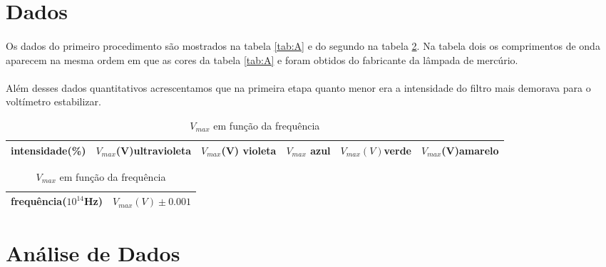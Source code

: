 \documentclass[a4paper,11pt]{article}
\begin{document}
\section{Dados}
\paragraph{}Os dados do primeiro procedimento são 
mostrados na tabela \ref{tab:A} e do segundo na tabela
\ref{tab:B}. Na tabela dois os comprimentos de onda 
aparecem na mesma ordem em que as cores da tabela
\ref{tab:A} e foram obtidos do fabricante da lâmpada de
mercúrio.

\paragraph{}Além desses dados quantitativos acrescentamos
que na primeira etapa quanto menor era a intensidade
do filtro mais demorava para o voltímetro estabilizar.
\begin{table}[!htp]
    \centering
    \hspace{-10 cm}
    \parbox{.45\linewidth}
		{
		\begin{tabular}{|l|l|l|l|l|l|}\hline
          intensidade(\%) & $V_{max}$(V)ultravioleta &
          $V_{max}$(V) violeta &
         $V_{max}$    azul &  $V_{max}(V)$verde &
         $V_{max}$(V)amarelo\\ \hline
			
		\end{tabular}
        \caption{$V_{max}$ em função da intensidade}
		\label{tab:A}
		}

\parbox{.45\linewidth}
		{
		\centering
		\begin{tabular}{|l|l|}\hline
          frequência($10^{14}$Hz) & $V_{max}(V)\pm 0.001$ \\ \hline
			
		\end{tabular}
        \caption{$V_{max}$ em função da frequência}
		\label{tab:B}
		}

\end{table}

\newpage
\section{Análise de Dados}
\end{document}
